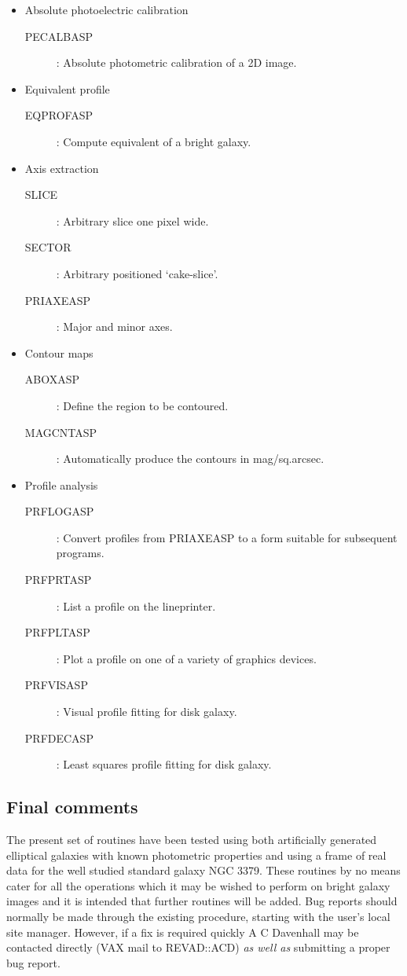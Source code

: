\begin{itemize}
\item Absolute photoelectric calibration
\begin{description}
\item [PECALBASP]: Absolute photometric calibration of a 2D image.
\end{description}
\item Equivalent profile
\begin{description}
\item [EQPROFASP]: Compute equivalent of a bright galaxy.
\end{description}
\item Axis extraction
\begin{description}
\item [SLICE]: Arbitrary slice one pixel wide.
\item [SECTOR]: Arbitrary positioned `cake-slice'.
\item [PRIAXEASP]: Major and minor axes.
\end{description}
\item Contour maps
\begin{description}
\item [ABOXASP]: Define the region to be contoured.
\item [MAGCNTASP]: Automatically produce the contours in mag/sq.arcsec.
\end{description}
\item Profile analysis
\begin{description}
\item [PRFLOGASP]: Convert profiles from PRIAXEASP to a form suitable for
subsequent programs.
\item [PRFPRTASP]: List a profile on the lineprinter.
\item [PRFPLTASP]: Plot a profile on one of a variety of graphics devices.
\item [PRFVISASP]: Visual profile fitting for disk galaxy.
\item [PRFDECASP]: Least squares profile fitting for disk galaxy.
\end{description}
\end{itemize}
\subsection {Final comments}
The present set of routines have been tested using both artificially generated
elliptical galaxies with known photometric properties and using a frame of
real data for the well studied standard galaxy NGC 3379.
These routines by no means cater for all the operations which it may be wished
to perform on bright galaxy images and it is intended that further routines will
be added.
Bug reports should normally be made through the existing procedure, starting
with the user's local site manager.
However, if a fix is required quickly A C Davenhall may be contacted directly
(VAX mail to REVAD::ACD) {\em as well as} submitting a proper bug report.
